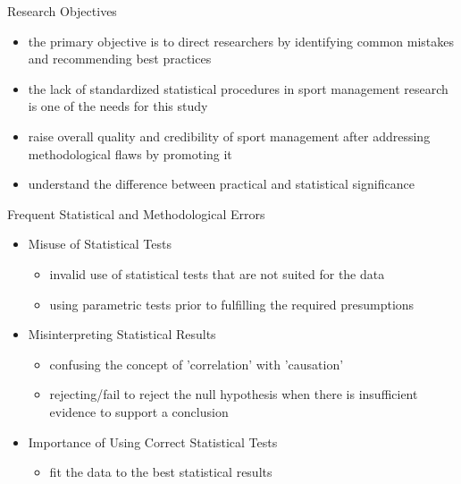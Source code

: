 \documentclass[aspectratio=169, 12pt]{beamer}
\begin{document}
\begin{frame}{Research Objectives}
  \begin{itemize}
      \item the primary objective is to direct researchers by identifying common mistakes and recommending best practices
      \item the lack of standardized statistical procedures in sport management research is one of the needs for this study
      \item raise overall quality and credibility of sport management after addressing methodological flaws by promoting it
      \item understand the difference between practical and statistical significance
  \end{itemize}
\end{frame}


\begin{frame}{Frequent Statistical and Methodological Errors}
  \begin{itemize}
      \item Misuse of Statistical Tests
        \begin{itemize}
            \item invalid use of statistical tests that are not suited for the data
            \item using parametric tests prior to fulfilling the required presumptions
        \end{itemize}
      \item Misinterpreting Statistical Results
        \begin{itemize}
            \item confusing the concept of 'correlation' with 'causation'
            \item rejecting/fail to reject the null hypothesis when there is insufficient evidence to support a conclusion
        \end{itemize}
      \item Importance of Using Correct Statistical Tests
        \begin{itemize}
            \item fit the data to the best statistical results
        \end{itemize}
  \end{itemize}
\end{frame}
\end{document}
